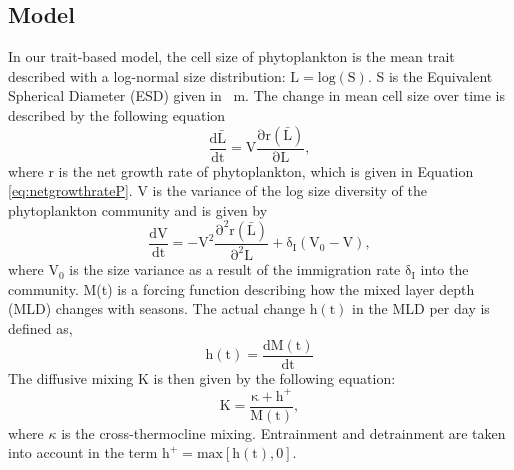\subsection{Model}
In our trait-based model, the cell size of phytoplankton is the mean trait described with a log-normal size distribution: $\mathrm{L=log(S)}$. S is the Equivalent Spherical Diameter (ESD) given in \si{\mu m}. The change in mean cell size over time is described by the following equation
\begin{equation}
    \label{eq:changecellsize}
    \mathrm{\frac{d\bar{L}}{dt} = V\frac{\partial r(\bar{L})}{\partial L}},
\end{equation}
where r is the net growth rate of phytoplankton, which is given in Equation \eqref{eq:netgrowthrateP}. V is the variance of the log size diversity of the phytoplankton community and is given by
\begin{equation}
    \label{eq:variance}
    \mathrm{\frac{dV}{dt} = -V^{2}\frac{\partial^{2} r(\bar{L})}{\partial^{2} L}+\delta_I(V_0-V)},
\end{equation}
where $\mathrm{V_0}$ is the size variance as a result of the immigration rate $\mathrm{\delta_I}$ into the community.
\newline
\newline
M(t) is a forcing function describing how the mixed layer depth (MLD) changes with seasons. The actual change $\mathrm{h(t)}$ in the MLD per day is defined as,
\begin{equation}
    \label{eq:h(t)}
    \mathrm{h(t) = \frac{dM(t)}{dt}}
\end{equation}
The diffusive mixing K is then given by the following equation:
\begin{equation}
    \label{eq:K}
    \mathrm{K = \frac{\kappa+h^{+}}{M(t)}},
\end{equation}
where $\kappa$ is the cross-thermocline mixing. Entrainment and detrainment are taken into account in the term $\mathrm{h^{+} = max[h(t),0]}$.

